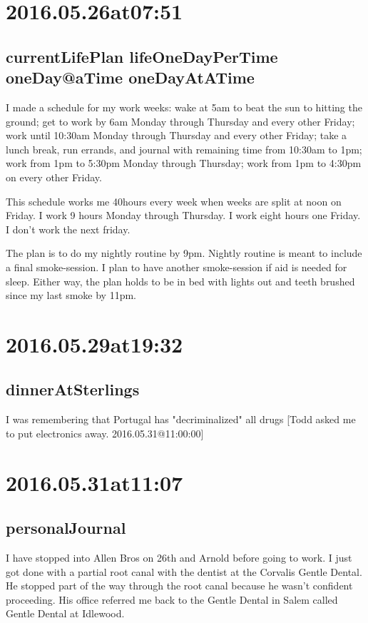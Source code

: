\section*{ 2016.05.26at07:51 }
\subsection*{currentLifePlan lifeOneDayPerTime oneDay@aTime oneDayAtATime}
I made a schedule for my work weeks: wake at 5am to beat the sun to hitting the ground; get to work by 6am Monday through Thursday and every other Friday; work until 10:30am Monday through Thursday and every other Friday; take a lunch break, run errands, and journal with remaining time from 10:30am to 1pm; work from 1pm to 5:30pm Monday through Thursday; work from 1pm to 4:30pm on every other Friday.

This schedule works me 40hours every week when weeks are split at noon on Friday. I work 9 hours Monday through Thursday. I work eight hours one Friday. I don't work the next friday.

The plan is to do my nightly routine by 9pm. Nightly routine is meant to include a final smoke-session. I plan to have another smoke-session if aid is needed for sleep. Either way, the plan holds to be in bed with lights out and teeth brushed since my last smoke by 11pm.

\section*{ 2016.05.29at19:32 }
\subsection*{dinnerAtSterlings}
I was remembering that Portugal has "decriminalized" all drugs [Todd asked me to put electronics away. 2016.05.31@11:00:00]

\section*{ 2016.05.31at11:07 }
\subsection*{personalJournal}
I have stopped into Allen Bros on 26th and Arnold before going to work. I just got done with a partial root canal with the dentist at the Corvalis Gentle Dental. He stopped part of the way through the root canal because he wasn't confident proceeding. His office referred me back to the Gentle Dental in Salem called Gentle Dental at Idlewood.

